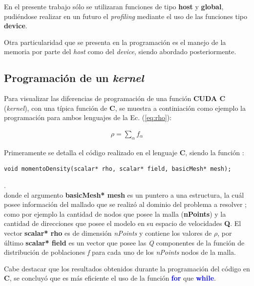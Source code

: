 En el presente trabajo sólo se utilizaran funciones de tipo \textbf{host} y \textbf{global}, pudiéndose realizar en un futuro el  \textit{profiling} mediante el uso de las funciones tipo \textbf{device}.

Otra particularidad que se presenta en la programación es el manejo de la memoria por parte del \textit{host} como del \textit{device}, siendo abordado posteriormente.


\subsection{Programación de un \textit{kernel}}

Para visualizar las diferencias de programación de una función \textbf{CUDA C } (\textit{kernel}), con una típica función de \textbf{C}, se muestra a continiación como ejemplo la programación para ambos lenguajes de la Ec. (\ref{eq:rho}): 

\begin{align*}
	\rho = \sum_{\alpha} f_{\alpha}
\end{align*}

Primeramente se detalla el código realizado en el lenguaje \textbf{C}, siendo la función :

{\footnotesize
	\begin{frame}{}
		\begin{lstlisting}
void momentoDensity(scalar* rho, scalar* field, basicMesh* mesh);
		\end{lstlisting}
		
	\end{frame}
}.
\\
donde el argumento \textbf{basicMesh* mesh} es un puntero a una estructura, la cuál posee información del mallado que se realizó al dominio del problema a resolver ; como por ejemplo la cantidad de nodos que posee la malla (\textbf{nPoints}) y la cantidad de direcciones que posee el modelo en su espacio de velocidades \textbf{Q}. El vector  \textbf{scalar* rho} es de dimensión \textit{nPoints} y contiene los valores de $\rho$, por último \textbf{scalar* field} es un vector que posee las \textit{Q} componentes de la función de distribución de poblaciones \textit{f} para cada uno de los  \textit{nPoints} nodos de la malla.

Cabe destacar que los resultados obtenidos durante la programación del código en \textbf{C}, se concluyó que es más eficiente el uso de la función \textcolor{blue}{\textbf{for}} que \textcolor{blue}{\textbf{while}}.


